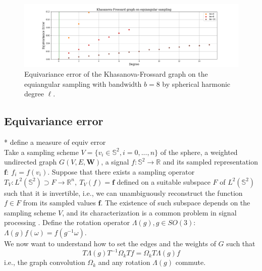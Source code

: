 \documentclass{article} %
\begin{document}
\begin{figure}[h!]
	\centering
	\includegraphics[width=\textwidth]{figures/KhasanovaFrossardgraphonequiangularsampling.png}

	\caption{\label{fig:Equivariance error of the Frossard-Khasanove graph}Equivariance error of the Khasanova-Frossard graph on the equiangular sampling with bandwidth $b=8$ by spherical harmonic degree $\ell$.}
\end{figure}


\subsection{Equivariance error}

* define a measure of equiv error\\
Take a sampling scheme $V=\{v_i\in\mathbb S^2, i=0, ..., n\}$ of the sphere, a weighted undirected graph $G(V, E, \mathbf W)$, a signal $f: \mathbb S^2\to\mathbb R$ and its sampled representation $\mathbf f:\ f_i=f(v_i)$. Suppose that there exists a sampling operator $T_V: L^2(\mathbb S^2) \supset F\to \mathbb R^n,\  T_V(f) = \mathbf f$ defined on a suitable subspace $F$ of $L^2(\mathbb S^2)$ such that it is invertible, i.e., we can unambiguously reconstruct the function $f\in F$ from its sampled values $\mathbf f$. The existence of such subspace depends on the sampling scheme $V$, and its characterization is a common problem in signal processing \cite{Driscoll:1994:CFT:184069.184073}. Define the rotation operator $\Lambda(g), g\in SO(3)$: $\Lambda(g) f(\omega)=f\left(g^{-1} \omega\right)$.\\

We now want to understand how to set the edges and the weights of $G$ such that
\begin{equation}\label{eq:equivariance}
T \Lambda(g) T^{-1} \Omega_k T f = \Omega_k T \Lambda(g) f
\end{equation}
i.e., the graph convolution $\Omega_k$ and any rotation $\Lambda(g)$ commute.
\end{document}
